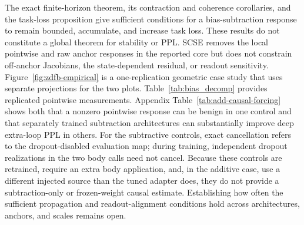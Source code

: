 \documentclass[letterpaper]{article} %
\newcommand{\SCSE}{\textsc{SCSE}}
\theoremstyle{remark}
\begin{document}
The exact finite-horizon theorem, its contraction and coherence corollaries, and the task-loss proposition give sufficient conditions for a bias-subtraction response to remain bounded, accumulate, and increase task loss.  These results do not constitute a global theorem for stability or PPL.  \SCSE{} removes the local pointwise and raw anchor responses in the reported core but does not constrain off-anchor Jacobians, the state-dependent residual, or readout sensitivity.  Figure~\ref{fig:zdfb-empirical} is a one-replication geometric case study that uses separate projections for the two plots.  Table~\ref{tab:bias_decomp} provides replicated pointwise measurements.  Appendix Table~\ref{tab:add-causal-forcing} shows both that a nonzero pointwise response can be benign in one control and that separately trained subtraction architectures can substantially improve deep extra-loop PPL in others.  For the subtractive controls, exact cancellation refers to the dropout-disabled evaluation map; during training, independent dropout realizations in the two body calls need not cancel.  Because these controls are retrained, require an extra body application, and, in the additive case, use a different injected source than the tuned adapter does, they do not provide a subtraction-only or frozen-weight causal estimate.  Establishing how often the sufficient propagation and readout-alignment conditions hold across architectures, anchors, and scales remains open.
\end{document}
